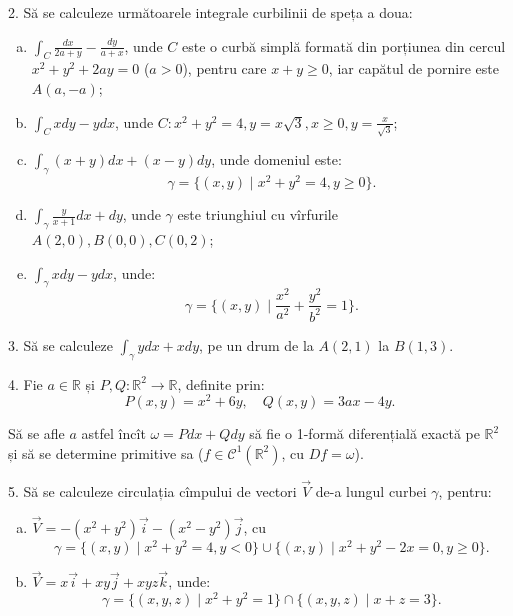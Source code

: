 \documentclass[11pt,a4paper]{article}
\newcommand\kal{\mathcal}
\newcommand\RR{\mathbb{R}}
\theoremstyle{dotless}
\theoremstyle{dotlessdr}
\begin{document}
\vspace{1cm}

2. Să se calculeze următoarele integrale curbilinii de speța a doua:
\begin{enumerate}[(a)]
\item $\int_C \frac{dx}{2a + y} - \frac{dy}{a + x}$, unde $C$ este o curbă
  simplă formată din porțiunea din cercul $x^2 + y^2 + 2ay = 0$ ($a > 0$),
  pentru care $x + y \geq 0$, iar capătul de pornire este $A(a, -a)$;
\item $\int_C xdy - ydx$, unde $C: x^2 + y^2 = 4, y = x \sqrt{3}, x \geq 0, %
  y = \frac{x}{\sqrt{3}}$;
\item $\int_\gamma (x + y) dx + (x - y) dy$, unde domeniul este:
  \[
    \gamma = \{(x, y) \mid x^2 + y^2 = 4, y \geq 0\}.
  \]
\item $\int_\gamma \frac{y}{x + 1} dx + dy$, unde $\gamma$ este triunghiul cu
  vîrfurile $A(2, 0), B(0, 0), C(0, 2)$;
\item $\int_\gamma xdy - ydx$, unde:
  \[
    \gamma = \{(x, y) \mid \frac{x^2}{a^2} + \frac{y^2}{b^2} = 1 \}.
  \]
\end{enumerate}

\vspace{1cm}

3. Să se calculeze $\int_\gamma ydx + xdy$, pe un drum de la $A(2, 1)$
la $B(1, 3)$.

\vspace{1cm}

4. Fie $a \in \RR$ și $P, Q : \RR^2 \to \RR$, definite prin:
\[
  P(x, y) = x^2 + 6y, \quad Q(x, y) = 3ax - 4y.
\]

Să se afle $a$ astfel încît $\omega = Pdx + Qdy$ să fie o 1-formă diferențială
exactă pe $\RR^2$ și să se determine primitive sa ($f \in \kal{C}^1(\RR^2)$, cu
$Df = \omega$).

\vspace{1cm}

5. Să se calculeze circulația cîmpului de vectori $\vec{V}$ de-a lungul curbei
$\gamma$, pentru:
\begin{enumerate}[(a)]
\item $\vec{V} = -(x^2 + y^2) \vec{i} - (x^2 - y^2) \vec{j}$, cu
  \[
    \gamma = \{(x, y) \mid x^2 + y^2 = 4, y < 0 \} \cup %
    \{(x, y) \mid x^2 + y^2 - 2x = 0, y \geq 0 \}.
  \]
\item $\vec{V} = x\vec{i} + xy \vec{j} + xyz \vec{k}$, unde:
  \[
    \gamma = \{(x, y, z) \mid x^2 + y^2 = 1 \} \cap
    \{(x, y, z) \mid x + z = 3 \}.
  \]
\end{enumerate}
\end{document}

